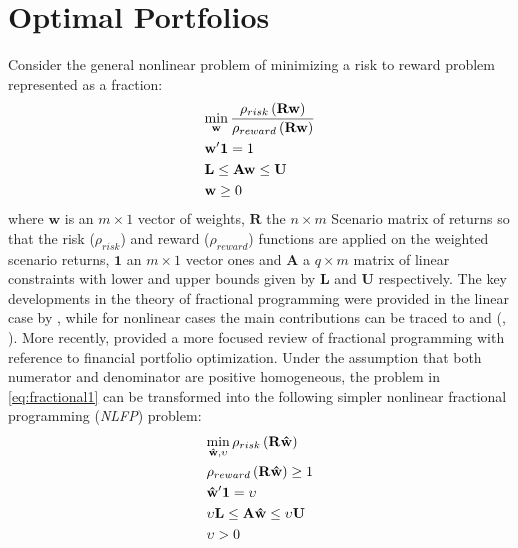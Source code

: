 \section{Optimal Portfolios}\label{sec:4}
Consider the general nonlinear problem of minimizing a risk to reward problem represented as a fraction:
\begin{equation}\label{eq:fractional1}
\begin{gathered}
  \mathop {\min }\limits_{\mathbf{w}} \frac{{{\rho _{risk}}\left( {{\mathbf{Rw}}} \right)}}{{{\rho _{reward}}\left( {{\mathbf{Rw}}} \right)}} \hfill \\
  {\mathbf{w}}'{\mathbf{1}}=1 \hfill \\
  {\mathbf{L}} \leq {\mathbf{Aw}} \leq {\mathbf{U}} \hfill \\
  {\mathbf{w}} \geq 0 \hfill \\
\end{gathered}
\end{equation}
where $\mathbf{w}$ is an $m\times 1$ vector of weights, $\mathbf{R}$ the
$n\times m$ Scenario matrix of returns so that the risk ($\rho_{risk}$) and
reward ($\rho_{reward}$) functions are applied on the weighted scenario
returns, $\mathbf{1}$ an $m\times 1$  vector ones and $\mathbf{A}$ a $q\times
m$ matrix of linear constraints with lower and upper bounds given by
$\mathbf{L}$ and $\mathbf{U}$ respectively. The key developments in the
theory of fractional programming were provided in the linear case by
, while for nonlinear cases the main contributions
can be traced to  and
(\citeyear*{Schaible1976a},
\citeyear*{Schaible1976b}). More recently,  provided
a more focused review of fractional programming with reference to financial
portfolio optimization. Under the assumption that both numerator and
denominator are positive homogeneous, the problem in \eqref{eq:fractional1}
can be transformed into the following simpler nonlinear fractional
programming (\emph{NLFP}) problem:
\begin{equation}\label{eq:fractional2}
\begin{gathered}
  \mathop {\min }\limits_{{\mathbf{\hat w}},\upsilon } {\rho _{risk}}\left( {{\mathbf{R\hat w}}} \right) \hfill \\
  {\rho _{reward}}\left( {{\mathbf{R\hat w}}} \right) \geq 1 \hfill \\
  {\mathbf{\hat w}}'{\mathbf{1}}=\upsilon  \hfill \\
  \upsilon {\mathbf{L}} \leq {\mathbf{A\hat w}} \leq \upsilon {\mathbf{U}} \hfill \\
  \upsilon  > 0 \hfill \\
\end{gathered}
\end{equation}
